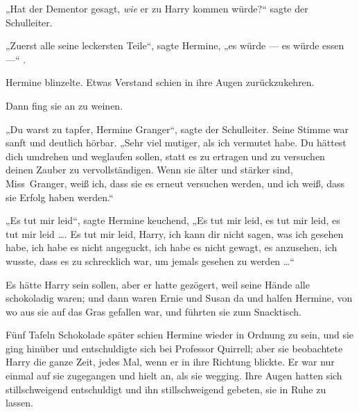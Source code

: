 „Hat der Dementor gesagt, \emph{wie} er zu Harry kommen würde?“ sagte der Schulleiter.

„Zuerst alle seine leckersten Teile“, sagte Hermine, „es würde — es würde essen —“ .

Hermine blinzelte. Etwas Verstand schien in ihre Augen zurückzukehren.

Dann fing sie an zu weinen.

„Du warst zu tapfer, Hermine Granger“, sagte der Schulleiter. Seine Stimme war sanft und deutlich hörbar.
„Sehr viel mutiger, als ich vermutet habe. Du hättest dich umdrehen und weglaufen sollen, statt es zu ertragen und zu versuchen deinen Zauber zu vervollständigen. Wenn sie älter und stärker sind, Miss~Granger, weiß ich, dass sie es erneut versuchen werden, und ich weiß, dass sie Erfolg haben werden.“

„Es tut mir leid“, sagte Hermine keuchend,
„Es tut mir leid, es tut mir leid, es tut mir leid …. Es tut mir leid, Harry, ich kann dir nicht sagen, was ich gesehen habe, ich habe es nicht angeguckt, ich habe es nicht gewagt, es anzusehen, ich wusste, dass es zu schrecklich war, um jemals gesehen zu werden …“

Es hätte Harry sein sollen, aber er hatte gezögert, weil seine Hände alle schokoladig waren; und dann waren Ernie und Susan da und halfen Hermine, von wo aus sie auf das Gras gefallen war, und führten sie zum Snacktisch.

Fünf Tafeln Schokolade später schien Hermine wieder in Ordnung zu sein, und sie ging hinüber und entschuldigte sich bei Professor Quirrell; aber sie beobachtete Harry die ganze Zeit, jedes Mal, wenn er in ihre Richtung blickte. Er war nur einmal auf sie zugegangen und hielt an, als sie wegging. Ihre Augen hatten sich stillschweigend entschuldigt und ihn stillschweigend gebeten, sie in Ruhe zu lassen.


